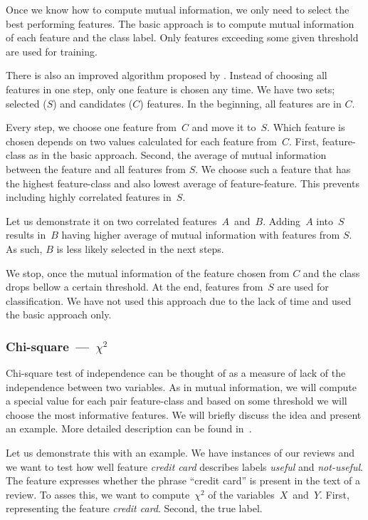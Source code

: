 Once we know how to compute mutual information,
we only need to select the best performing features.
The basic approach is to compute mutual information of each feature and the class label.
Only features exceeding some given threshold are used for training.

There is also an improved algorithm proposed by \citet{Hoq14}.
Instead of choosing all features in one step,
only one feature is chosen any time.
We have two sets; selected ($S$) and candidates ($C$) features.
In the beginning, all features are in $C$.

Every step, we choose one feature from~$C$ and move it to~$S$.
Which feature is chosen depends on two values calculated for each feature from~$C$.
First, feature-class as in the basic approach.
Second, the average of mutual information between the feature and all features from $S$.
We choose such a feature that has the highest feature-class and also lowest average of feature-feature.
This prevents including highly correlated features in~$S$.

Let us demonstrate it on two correlated features~$A$~and~$B$.
Adding~$A$ into~$S$ results in~$B$ having higher average of mutual information with features from $S$.
As such, $B$ is less likely selected in the next steps.

We stop, once the mutual information of the feature chosen from $C$ and the class drops bellow a certain
threshold.
At the end, features from~$S$ are used for classification.
We have not used this approach due to the lack of time and used the basic approach only.


\subsubsection{Chi-square~---~$\chi^2$}

Chi-square test of independence can be thought of
as a measure of lack of the independence between two variables.
As in mutual information,
we will compute a special value for each pair feature-class
and based on some threshold we will choose the most informative features.
We will briefly discuss the idea and present an example.
More detailed description can be found in~\citet{Hugh13}.


Let us demonstrate this with an example.
We have instances of our reviews and we want to test how well
feature \textit{credit card} describes
labels \textit{useful} and \textit{not-useful}.
The feature expresses whether the phrase ``credit card'' is present in the text of a review.
To asses this, we want to compute~$\chi^2$ of the variables~$X$~and~$Y$.
First, representing the feature \textit{credit card}.
Second, the true label.

